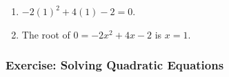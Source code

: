 {\begin{mdframed}[linewidth=4, leftmargin=40, rightmargin=40]
\begin{exercise}
\begin{enumerate}[noitemsep, label=\textbf{Step} \textbf{\arabic*}. ]
        
        \label{m39247*id153229}In this case, the quadratic is a perfect square, so there is only one solution
for \begin{math}x\end{math}: \begin{math}x=1\end{math}.\par 
        \item  
        \label{m39247*id1532632}\begin{math}-2{\left(1\right)}^{2}+4\left(1\right)-2=0\end{math}.
 \par 
        \item  
        \label{m39247*id153262}The root of \begin{math}0=-2{x}^{2}+4x-2\end{math} is \begin{math}x=1\end{math}.
 \par 
        \end{enumerate}
         

    \end{exercise}
    \end{mdframed}
    }
    \noindent
  
\label{m39247*secfhsst!!!underscore!!!id2946}
            \subsubsection{Exercise:  Solving Quadratic Equations }
            \nopagebreak
            
